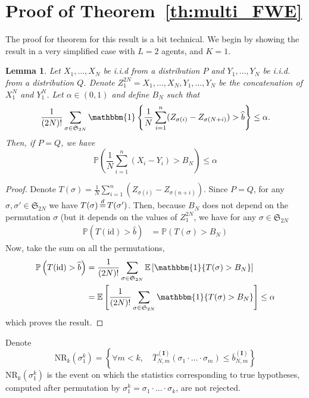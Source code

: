 \documentclass{article}
\theoremstyle{plain}
\newtheorem{Lemma}{Lemma}
\theoremstyle{remark}
\renewcommand{\P}{\mathbb{P}}
\newcommand{\E}{\mathbb{E}}
\renewcommand{\S}{\mathfrak{S}}
\newcommand{\1}{\mathbbm{1}}
\newcommand{\id}{\mathrm{id}}
\newcommand{\dec}{\,{\buildrel d \over =}\,}
\numberwithin{equation}{section}
\begin{document}
\section{Proof of Theorem~\ref{th:multi_FWE}}
The proof for theorem for this result is a bit technical. We begin by showing the result in a very simplified case with $L=2$ agents, and $K=1$.
\begin{Lemma}\label{lem:quantile_permu_2}
  Let $X_1,\dots,X_N$ be i.i.d from a distribution $P$ and $Y_1,\dots,Y_N$ be i.i.d. from a distribution $Q$. Denote $Z_1^{2N}=X_1,\dots,X_N,Y_1,\dots,Y_N$ be the concatenation of $X_1^N$ and $Y_1^N$. Let $\alpha \in (0,1)$ and define $B_N$ such that 
  $$ \frac{1}{(2N)!}\sum_{\sigma\in \S_{2N}} \1\left\{ \frac{1}{N}\sum_{i=1}^n (Z_{\sigma(i)}-Z_{\sigma(N+i)}) > \widehat{b}\right\}\le \alpha.$$
  Then, if $P=Q$, we have 
  $$\P\left(\frac{1}{N}\sum_{i=1}^n (X_i-Y_i) > B_N \right)\le \alpha $$ 
\end{Lemma}
\begin{proof}
  Denote $T(\sigma)= \frac{1}{N}\sum_{i=1}^n (Z_{\sigma(i)}-Z_{\sigma(n+i)})$. Since $P=Q$, for any $\sigma,\sigma' \in \S_{2N}$ we have $T(\sigma)\dec T(\sigma')$. Then, because $B_N$ does not depend on the permutation $\sigma$ (but it depends on the values of $Z_1^{2N}$, we have for any $\sigma \in \S_{2N}$
  \begin{align*}
    \P\left(T(\id)> \widehat{b}\right)&=\P\left(T(\sigma)> B_N\right)
  \end{align*} 
  Now, take the sum on all the permutations, 
  \begin{align*}
    \P\left(T(\id)> \widehat{b}\right)&=\frac{1}{(2N)!}\sum_{\sigma\in \S_{2N}} \E\left[\1\{T(\sigma)> B_N\}\right]\\
                                      &=  \E\left[\frac{1}{(2N)!}\sum_{\sigma\in \S_{2N}}\1\{T(\sigma)> B_N\}\right]\le \alpha
  \end{align*}
  which proves the result.
\end{proof}

Denote 
$$\mathrm{NR}_k(\sigma_1^k) = \left\{\forall m < k,\quad  \overline{T}_{N,m}^{(\textbf{I})}(\sigma_1\cdot\ldots\cdot\sigma_m) \le   \overline{b}_{N,m}^{(\textbf{I})}\right\}$$
$\mathrm{NR}_k(\sigma_1^k)$ is the event on which the statistics corresponding to true hypotheses, computed after permutation by $\sigma_1^k=\sigma_1\cdot \ldots \cdot \sigma_k$, are not rejected.
\end{document}
